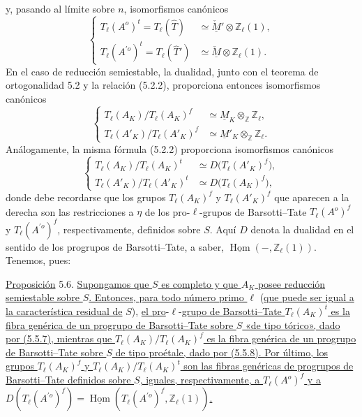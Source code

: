 y, pasando al límite sobre $n$, isomorfismos canónicos
\begin{equation}\tag{5.5.7}
 \left\{
 \begin{aligned}
  T_\ell(A^o)^t=T_\ell(\widehat T)
   &\simeq \check{\underline M}'\otimes\mathbb Z_\ell(1),\\[1ex]
  T_\ell(A^{\prime o})^t=T_\ell(\widehat T')
   &\simeq \check{\underline M}\otimes\mathbb Z_\ell(1).
 \end{aligned}
 \right.
\end{equation}
En el caso de reducción semiestable, la dualidad, junto con el teorema
de ortogonalidad 5.2 y la relación (5.2.2), proporciona entonces
isomorfismos canónicos
\begin{equation}\tag{5.5.8}
 \left\{
 \begin{aligned}
  T_\ell(A_K)/T_\ell(A_K)^f
   &\simeq \underline M_K\otimes_{\mathbb Z}\mathbb Z_\ell,\\[1ex]
  T_\ell(A'_K)/T_\ell(A'_K)^f
   &\simeq \underline M'_K\otimes_{\mathbb Z}\mathbb Z_\ell.
 \end{aligned}
 \right.
\end{equation}
Análogamente, la misma fórmula (5.2.2) proporciona isomorfismos
canónicos
\begin{equation}\tag{5.5.9}
 \left\{
 \begin{aligned}
  T_\ell(A_K)/T_\ell(A_K)^t
   &\simeq D\bigl(T_\ell(A'_K)^f\bigr),\\[1ex]
  T_\ell(A'_K)/T_\ell(A'_K)^t
   &\simeq D\bigl(T_\ell(A_K)^f\bigr),
 \end{aligned}
 \right.
\end{equation}
donde debe recordarse que los grupos $T_\ell(A_K)^f$ y
$T_\ell(A'_K)^f$ que aparecen a la derecha son las restricciones a
$\eta$ de los pro-$\ell$-grupos de Barsotti--Tate $T_\ell(A^o)^f$ y
$T_\ell(A^{\prime o})^f$, respectivamente, definidos sobre $S$. Aquí
$D$ denota la dualidad en el sentido de los progrupos de Barsotti--Tate,
a saber, $\underline{\operatorname{Hom}}(-,\mathbb Z_\ell(1))$.
Tenemos, pues:

\medskip
\noindent
\underline{Proposición} 5.6. \underline{Supongamos que $S$ es completo
y que $A_K$ posee reducción semiestable sobre $S$. Entonces, para todo
número primo $\ell$} (\underline{que puede ser igual a la característica residual
de} $S$), \underline{el pro}-$\ell$-\underline{grupo de Barsotti--Tate $T_\ell(A_K)^t$ es la
fibra genérica de un progrupo de Barsotti--Tate sobre $S$ «de tipo
tórico», dado por (5.5.7), mientras que
$T_\ell(A_K)/T_\ell(A_K)^f$ es la fibra genérica de un progrupo de
Barsotti--Tate sobre $S$ de tipo proétale, dado por (5.5.8). Por último,
los grupos $T_\ell(A_K)^f$ y $T_\ell(A_K)/T_\ell(A_K)^t$ son las fibras
genéricas de progrupos de Barsotti--Tate definidos sobre $S$, iguales,
respectivamente, a $T_\ell(A^o)^f$ y a
$D(T_\ell(A^{\prime o})^f)=
\underline{\operatorname{Hom}}(T_\ell(A^{\prime o})^f,
\mathbb Z_\ell(1))$.}

